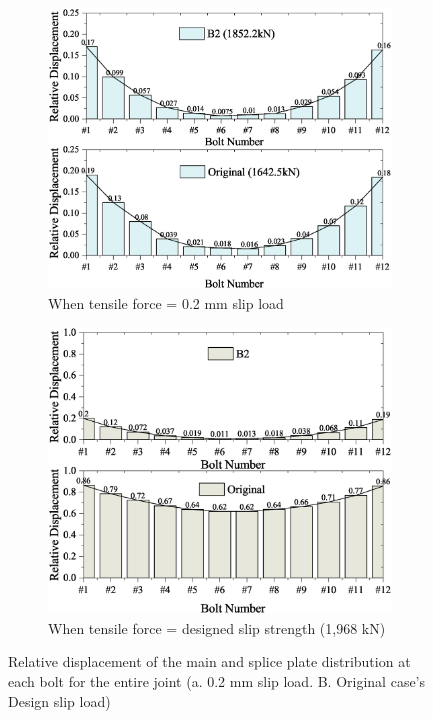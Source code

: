 \begin{figure}[htbp]
\centering
    \begin{subfigure}[t]{0.49\textwidth}
        \centering
        \includegraphics[width=\linewidth]{imgs/ch5/re-eabt-02.eps}
        \caption{When tensile force = 0.2 mm slip load}
        \label{fig-f02rdd}
    \end{subfigure}
    \hfill
    \begin{subfigure}[t]{0.49\textwidth}
        \centering
    \includegraphics[width=\linewidth]{imgs/ch5/re-eabt-ds.eps}
    \caption{When tensile force = designed slip strength (1,968 kN)}
    \label{fig-fdsrdd}
    \end{subfigure}
\caption{Relative  displacement of the main and splice plate distribution at each bolt for the entire joint (a. 0.2 mm slip load. B. Original case's Design slip load)}
\label{fig-rdd}
\end{figure}

